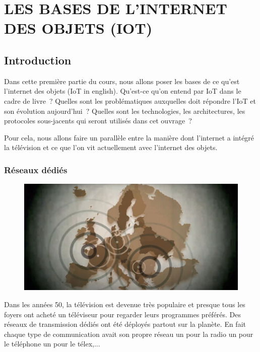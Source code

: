 \cleardoublepage
\chapter{LES BASES DE L'INTERNET DES OBJETS (IOT)}

\section{Introduction}

  \vspace{1em}
 \begin{figure}
\end{figure}
 Dans cette première partie du cours, nous allons poser les bases de ce qu'est l'internet des objets (\ac{IoT} in english). Qu'est-ce qu'on entend par \ac{IoT} dans le cadre de livre~? Quelles sont les problématiques auxquelles doit répondre l'\ac{IoT} et son évolution aujourd'hui~? Quelles sont les technologies, les architectures, les protocoles sous-jacents qui seront utilisés dans cet ouvrage~? 
 
 Pour cela, nous allons faire un parallèle entre la manière dont l'internet a intégré la télévision et ce que l'on vit actuellement avec l'internet des objets. 
 
 \subsection{Réseaux dédiés}
   \vspace{1em}

\begin{figure}
\centerline{\includegraphics[width=.4\columnwidth]{Pictures/illu-propa.png}}
\end{figure}

 Dans les années 50, la télévision est devenue très populaire et presque tous les foyers ont acheté un téléviseur pour regarder leurs programmes préférés. Des réseaux de transmission dédiés ont été déployés partout sur la planète. En fait chaque type de communication avait son propre réseau un pour la radio un pour le téléphone un pour le télex,...
 



